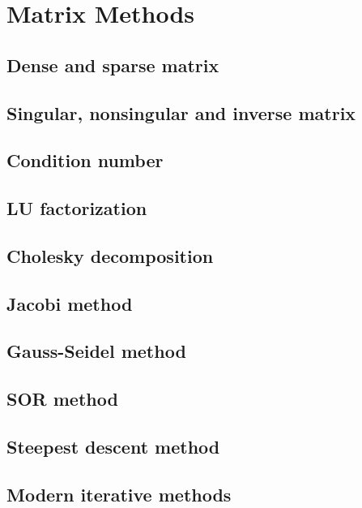 \documentclass{article}
\begin{document}
\section{Matrix Methods}



\subsection{Dense and sparse matrix}


\subsection{Singular, nonsingular and inverse matrix}


\subsection{Condition number}


\subsection{LU factorization}


\subsection{Cholesky decomposition}


\subsection{Jacobi method}


\subsection{Gauss-Seidel method}


\subsection{SOR method}


\subsection{Steepest descent method}


\subsection{Modern iterative methods}
\end{document}
